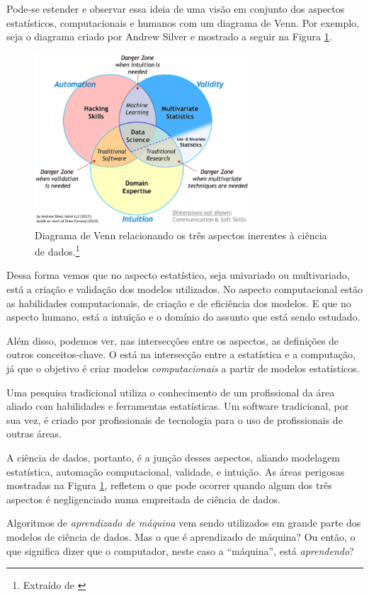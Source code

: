 Pode-se estender e observar essa ideia de uma visão em conjunto dos aspectos estatísticos, computacionais e humanos com um diagrama de Venn. Por exemplo, seja o diagrama criado por Andrew Silver \citep{venn} e mostrado a seguir na Figura \ref{fig:venn}.

\begin{figure}[htb]
\centering
\includegraphics[width=8cm]{figuras/venn}
\caption{Diagrama de Venn relacionando os três aspectos inerentes à ciência de dados.\footnote{Extraído de \citep{venn}}}
\label{fig:venn}
\end{figure}

Dessa forma vemos que no aspecto estatístico, seja univariado ou multivariado, está a criação e validação dos modelos utilizados. No aspecto computacional estão as habilidades computacionais, de criação e de eficiência dos modelos. E que no aspecto humano, está a intuição e o domínio do assunto que está sendo estudado.

Além disso, podemos ver, nas intersecções entre os aspectos, as definições de outros conceitos-chave. O  está na intersecção entre a estatística e a computação, já que o objetivo é criar modelos \emph{computacionais} a partir de modelos estatísticos. 

Uma pesquisa tradicional utiliza o conhecimento de um profissional da área aliado com habilidades e ferramentas estatísticas. Um software tradicional, por sua vez, é criado por profissionais de tecnologia para o uso de profissionais de outras áreas. 

A ciência de dados, portanto, é a junção desses aspectos, aliando modelagem estatística, automação computacional, validade, e intuição. As áreas perigosas mostradas na Figura \ref{fig:venn}, refletem o que pode ocorrer quando algum dos três aspectos é negligenciado numa empreitada de ciência de dados.

Algoritmos de \emph{aprendizado de máquina} vem sendo utilizados em grande parte dos modelos de ciência de dados. Mas o que é aprendizado de máquina? Ou então, o que significa dizer que o computador, neste caso a ``máquina'', está \emph{aprendendo}?

